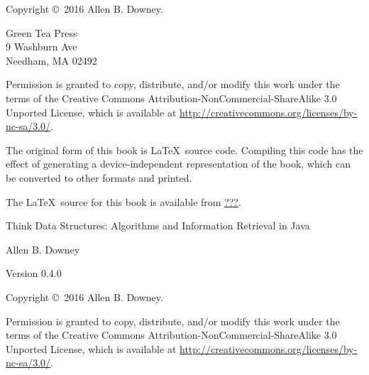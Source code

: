 \documentclass[12pt]{book}
\newcommand{\thetitle}{Think Data Structures}
\newcommand{\thesubtitle}{Algorithms and Information Retrieval in Java}
\newcommand{\theauthors}{Allen B. Downey}
\newcommand{\theversion}{0.4.0}
\theoremstyle{exercise}
\begin{document}
\begin{latexonly}
\newpage
\thispagestyle{empty}

Copyright \copyright ~2016 \theauthors.

\vspace{0.2in}

\begin{flushleft}
Green Tea Press \\
9 Washburn Ave \\
Needham, MA 02492
\end{flushleft}

Permission is granted to copy, distribute, and/or modify this work under the terms of the Creative Commons Attribution-NonCommercial-ShareAlike 3.0 Unported License, which is available at \url{http://creativecommons.org/licenses/by-nc-sa/3.0/}.

The original form of this book is \LaTeX\ source code.
Compiling this code has the effect of generating a device-independent representation of the book, which can be converted to other formats and printed.

The \LaTeX\ source for this book is available from
\url{???}.


\cleardoublepage
\setcounter{tocdepth}{1}
\tableofcontents

\end{latexonly}


\begin{htmlonly}

\vspace{1em}

{\Large \thetitle: \thesubtitle}

{\large \theauthors}

Version \theversion

\vspace{1em}

Copyright \copyright ~2016 \theauthors.

Permission is granted to copy, distribute, and/or modify this work under the terms of the Creative Commons Attribution-NonCommercial-ShareAlike 3.0 Unported License, which is available at \url{http://creativecommons.org/licenses/by-nc-sa/3.0/}.

\vspace{1em}

\end{htmlonly}
\end{document}
